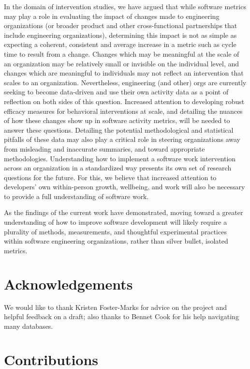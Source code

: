 \documentclass[
]{article}
\begin{document}
In the domain of intervention studies, we have argued that while
software metrics may play a role in evaluating the impact of changes
made to engineering organizations (or broader product and other
cross-functional partnerships that include engineering organizations),
determining this impact is not as simple as expecting a coherent,
consistent and average increase in a metric such as cycle time to result
from a change. Changes which may be meaningful at the scale of an
organization may be relatively small or invisible on the individual
level, and changes which are meaningful to individuals may not reflect
an intervention that scales to an organization. Nevertheless,
engineering (and other) orgs are currently seeking to become data-driven
and use their own activity data as a point of reflection on both sides
of this question. Increased attention to developing robust efficacy
measures for behavioral interventions at scale, and detailing the
nuances of how these changes show up in software activity metrics, will
be needed to answer these questions. Detailing the potential
methodological and statistical pitfalls of these data may also play a
critical role in steering organizations away from misleading and
inaccurate summaries, and toward appropriate methodologies.
Understanding how to implement a software work intervention across an
organization in a standardized way presents its own set of research
questions for the future. For this, we believe that increased attention
to developers' own within-person growth, wellbeing, and work will also
be necessary to provide a full understanding of software work.

As the findings of the current work have demonstrated, moving toward a
greater understanding of how to improve software development will likely
require a plurality of methods, measurements, and thoughtful
experimental practices within software engineering organizations, rather
than silver bullet, isolated metrics.

\section{Acknowledgements}\label{acknowledgements}

We would like to thank Kristen Foster-Marks for advice on the project
and helpful feedback on a draft; also thanks to Bennet Cook for his help
navigating many databases.

\section{Contributions}\label{contributions}
\end{document}
